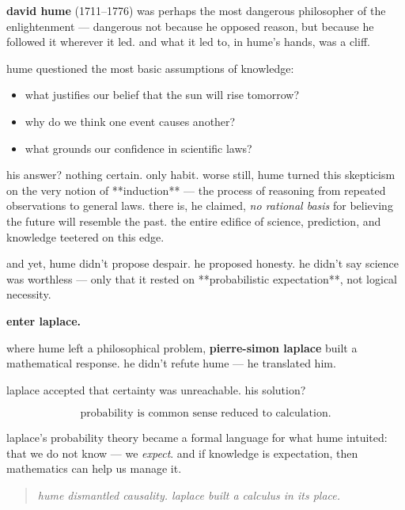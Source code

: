 \begin{tcolorbox}[colback=gray!5!white, colframe=black!75!white, title={historical sidebar: david hume and the uncertainty engine}]

    \textbf{david hume} (1711–1776) was perhaps the most dangerous philosopher of the enlightenment — dangerous not because he opposed reason, but because he followed it wherever it led.  and what it led to, in hume’s hands, was a cliff.
    
    \medskip
    
    hume questioned the most basic assumptions of knowledge:

    \medskip

    \begin{itemize}
        \item what justifies our belief that the sun will rise tomorrow?
        \item why do we think one event causes another?
        \item what grounds our confidence in scientific laws?
    \end{itemize}

    \medskip
    
    his answer? nothing certain. only habit.  worse still, hume turned this skepticism on the very notion of **induction** — the process of reasoning from repeated observations to general laws. there is, he claimed, \textit{no rational basis} for believing the future will resemble the past. the entire edifice of science, prediction, and knowledge teetered on this edge.
    
    \medskip
    
    and yet, hume didn’t propose despair. he proposed honesty. he didn’t say science was worthless — only that it rested on **probabilistic expectation**, not logical necessity.

    \medskip
    
    \textbf{enter laplace.}

    \medskip
    
    where hume left a philosophical problem, \textbf{pierre-simon laplace} built a mathematical response. he didn’t refute hume — he translated him.

    \medskip
    
    laplace accepted that certainty was unreachable. his solution?
    
    \[
    \text{probability is common sense reduced to calculation.}
    \]
    
    laplace’s probability theory became a formal language for what hume intuited:  
    that we do not know — we \textit{expect}. and if knowledge is expectation, then mathematics can help us manage it.
    
    \begin{quote}
    \textit{hume dismantled causality. laplace built a calculus in its place.}
    \end{quote}
    
\end{tcolorbox}
    

